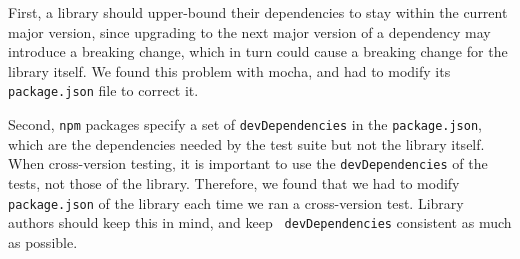 First, a library should upper-bound their dependencies to stay within
the current major version, since upgrading to the next major version
of a dependency may introduce a breaking change, which in turn could
cause a breaking change for the library itself. We found this problem
with mocha, and had to modify its {\tt package.json} file to correct
it.

Second, {\tt npm} packages specify a set of {\tt devDependencies} in
the {\tt package.json}, which are the dependencies needed by the test
suite but not the library itself. When cross-version testing, it is
important to use the {\tt devDependencies} of the tests, not those of
the library. Therefore, we found that we had to modify {\tt
  package.json} of the library each time we ran a cross-version test.
Library authors should keep this in mind, and keep {\tt
  devDependencies} consistent as much as possible.




